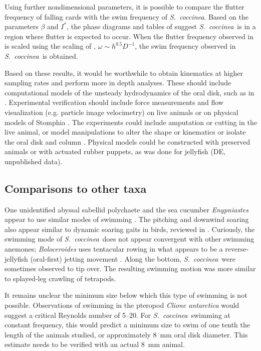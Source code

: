 \documentclass[10pt]{article}
\newcommand{\Genus}[1]{\emph{#1}}
\newcommand{\Stomphia}{\Genus{S.~coccinea}}
\begin{document}
Using further nondimensional parameters, it is possible to compare the flutter frequency of falling cards \citep{Pesavento:2004, Andersen:2005, Andersen:2005a} with the swim frequency of \Stomphia.  Based on the parameters $\beta$ and $I^*$, the phase diagrams and tables of \citet{Pesavento:2004} suggest \Stomphia\ is in a region where flutter is expected to occur.  When the flutter frequency observed in \citep{Pesavento:2004} is scaled using the scaling of \citep{Mahadevan:1999}, $\omega \sim h^{0.5} D^{-1}$, the swim frequency observed in \Stomphia\ is obtained.
	
Based on these results, it would be worthwhile to obtain kinematics at higher sampling rates and perform more in depth analyses.  These should include computational models of the unsteady hydrodynamics of the oral disk, such as in \citep{Mahadevan:1999, Pesavento:2004, Andersen:2005, Andersen:2005a}.  Experimental verification should include force measurements and flow visualization (e.g. particle image velocimetry) on live animals or on physical models of Stomphia \citep{Koehl:2003, Vogel:2003}.  The experiments could include amputation or cutting in the live animal, or model manipulations to alter the shape or kinematics or isolate the oral disk and column \citep{Koehl:2003, Vogel:2003}.  Physical models could be constructed with preserved animals or with actuated rubber puppets, as was done for jellyfish (DE, unpublished data).   

\subsection*{Comparisons to other taxa}
	One unidentified abyssal sabellid polychaete and the sea cucumber {\em Enypniastes} appear to use similar modes of swimming \citep{Fothergill:2002, Ruppert:2003}.  The pitching and downwind soaring also appear similar to dynamic soaring gaits in birds, reviewed in \citep{Vogel:2003}.  Curiously, the swimming mode of \Stomphia\ does not appear convergent with other swimming anemones; \Genus{Boloceroides} uses tentacular rowing in what appears to be a reverse-jellyfish (oral-first) jetting movement \citep{Lawn:1982, Josephson:1966}.  Along the bottom, \Stomphia\ were sometimes observed to tip over.  The resulting swimming motion was more similar to splayed-leg crawling of tetrapods. 
	
It remains unclear the minimum size below which this type of swimming is not possible. Observations of swimming in the pteropod \Genus{Clione antarctica} \citep{Childress:2004} would suggest a critical Reynolds number of \numrange{5}{20}.  For \Stomphia\ swimming at constant frequency, this would predict a minimum size to swim of one tenth the length of the animals studied, or approximately \SI{8}{\milli\meter} oral disk diameter.  This estimate needs to be verified with an actual \SI{8}{\milli\meter} animal.   
\end{document}
